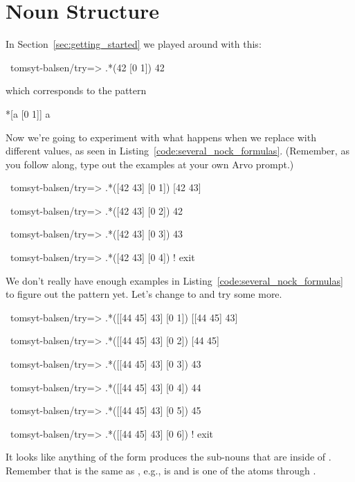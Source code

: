 \section{Noun Structure}

\label{sec:noun_structure}

In Section~\ref{sec:getting_started} we played around with this:

\begin{code}
~tomsyt-balsen/try=> .*(42 [0 1])
42
\end{code}
which corresponds to the pattern
\begin{code}
*[a [0 1]]                  a
\end{code}

Now we're going to experiment with what happens when we replace  with
different values, as seen in Listing~\ref{code:several_nock_formulas}. (Remember, as you follow along, type out the examples at your own Arvo prompt.)

\begin{codelisting}
\label{code:several_nock_formulas}
\begin{code}
~tomsyt-balsen/try=> .*([42 43] [0 1])
[42 43]

~tomsyt-balsen/try=> .*([42 43] [0 2])
42

~tomsyt-balsen/try=> .*([42 43] [0 3])
43

~tomsyt-balsen/try=> .*([42 43] [0 4])
! exit
\end{code}
\end{codelisting}

We don't really have enough examples in Listing~\ref{code:several_nock_formulas} to figure out the pattern yet. Let's
change \kode{[42 43]} to \kode{[[44 45] 43]} and try some more.
\begin{code}
~tomsyt-balsen/try=> .*([[44 45] 43] [0 1])
[[44 45] 43]

~tomsyt-balsen/try=> .*([[44 45] 43] [0 2])
[44 45]

~tomsyt-balsen/try=> .*([[44 45] 43] [0 3])
43

~tomsyt-balsen/try=> .*([[44 45] 43] [0 4])
44

~tomsyt-balsen/try=> .*([[44 45] 43] [0 5])
45

~tomsyt-balsen/try=> .*([[44 45] 43] [0 6])
! exit
\end{code}

It looks like anything of the form \kode{*[a [0 b]]} produces the sub-nouns that are inside of . Remember that \kode{*[a [0 b]]} is the same as , e.g.,  is \kode{[[44 45] 43]} and  is one of the atoms  through .

